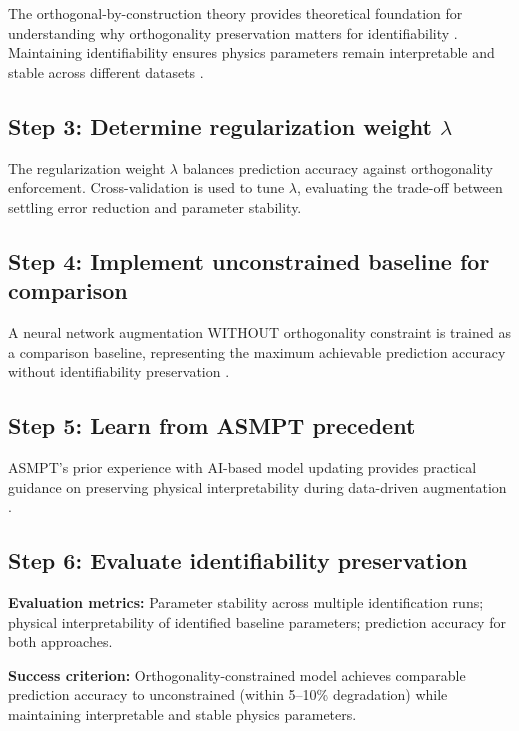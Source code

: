 The orthogonal-by-construction theory provides theoretical foundation for understanding why orthogonality preservation matters for identifiability \citep{gyorok2025orthogonal}. Maintaining identifiability ensures physics parameters remain interpretable and stable across different datasets \citep{schoukens2019nonlinear}.

\subsection{Step 3: Determine regularization weight $\lambda$}

The regularization weight $\lambda$ balances prediction accuracy against orthogonality enforcement. Cross-validation is used to tune $\lambda$, evaluating the trade-off between settling error reduction and parameter stability.

\subsection{Step 4: Implement unconstrained baseline for comparison}

A neural network augmentation WITHOUT orthogonality constraint is trained as a comparison baseline, representing the maximum achievable prediction accuracy without identifiability preservation \citep{bolderman2024physics}.

\subsection{Step 5: Learn from ASMPT precedent}

ASMPT's prior experience with AI-based model updating provides practical guidance on preserving physical interpretability during data-driven augmentation \citep{kessels2025}.

\subsection{Step 6: Evaluate identifiability preservation}

\textbf{Evaluation metrics:}
Parameter stability across multiple identification runs; physical interpretability of identified baseline parameters; prediction accuracy for both approaches.

\textbf{Success criterion:}
Orthogonality-constrained model achieves comparable prediction accuracy to unconstrained (within 5--10\% degradation) while maintaining interpretable and stable physics parameters.

